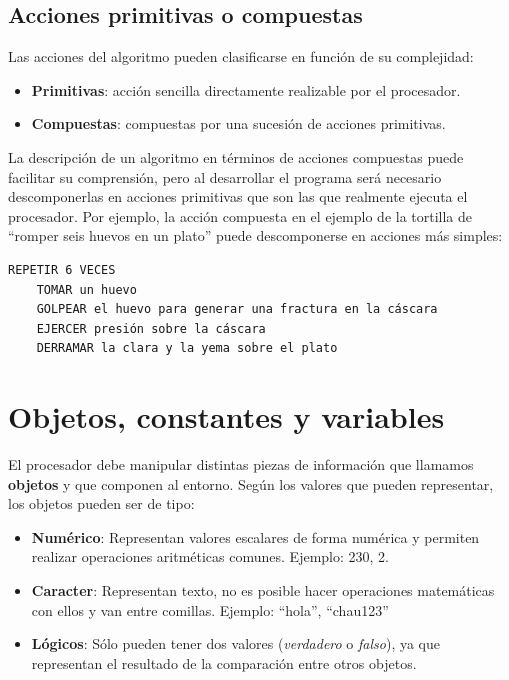 \documentclass[]{book}
\providecommand{\tightlist}{%
  \setlength{\itemsep}{0pt}\setlength{\parskip}{0pt}}
\begin{document}
\hypertarget{acciones-primitivas-o-compuestas}{%
\subsection{Acciones primitivas o compuestas}\label{acciones-primitivas-o-compuestas}}

Las acciones del algoritmo pueden clasificarse en función de su complejidad:

\begin{itemize}
\tightlist
\item
  \textbf{Primitivas}: acción sencilla directamente realizable por el procesador.
\item
  \textbf{Compuestas}: compuestas por una sucesión de acciones primitivas.
\end{itemize}

La descripción de un algoritmo en términos de acciones compuestas puede facilitar su comprensión, pero al desarrollar el programa será necesario descomponerlas en acciones primitivas que son las que realmente ejecuta el procesador. Por ejemplo, la acción compuesta en el ejemplo de la tortilla de ``romper seis huevos en un plato'' puede descomponerse en acciones más simples:

\begin{verbatim}
REPETIR 6 VECES
    TOMAR un huevo
    GOLPEAR el huevo para generar una fractura en la cáscara
    EJERCER presión sobre la cáscara
    DERRAMAR la clara y la yema sobre el plato
\end{verbatim}

\hypertarget{objetos-constantes-y-variables}{%
\section{Objetos, constantes y variables}\label{objetos-constantes-y-variables}}

El procesador debe manipular distintas piezas de información que llamamos \textbf{objetos} y que componen al entorno. Según los valores que pueden representar, los objetos pueden ser de tipo:

\begin{itemize}
\tightlist
\item
  \textbf{Numérico}: Representan valores escalares de forma numérica y permiten realizar
  operaciones aritméticas comunes. Ejemplo: 230, 2.
\item
  \textbf{Caracter}: Representan texto, no es posible hacer operaciones
  matemáticas con ellos y van entre comillas. Ejemplo: ``hola'', ``chau123''
\item
  \textbf{Lógicos}: Sólo pueden tener dos valores (\emph{verdadero} o \emph{falso}), ya que representan el resultado de la comparación entre otros objetos.
\end{itemize}
\end{document}
